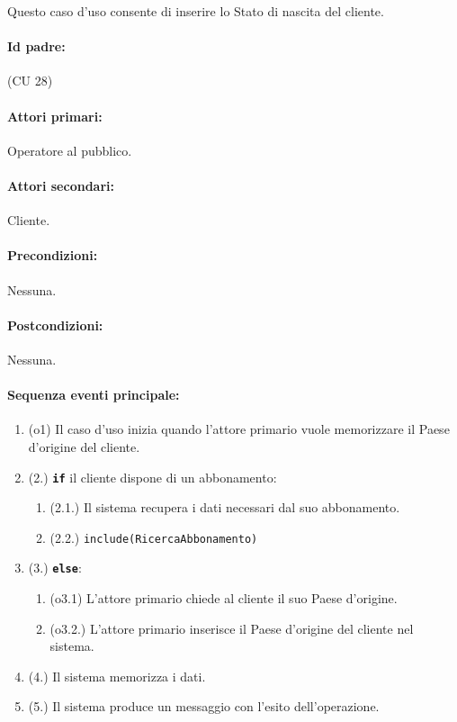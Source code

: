 \documentclass{article}
\begin{document}
	\indent\indent Questo caso d'uso consente di inserire lo Stato di nascita del cliente.
	
	\paragraph{Id padre:}(CU 28)
	
	\paragraph{Attori primari:}Operatore al pubblico.
	
	\paragraph{Attori secondari:}Cliente.
	
	\paragraph{Precondizioni:}Nessuna.
	
	\paragraph{Postcondizioni:}Nessuna.
	
	\paragraph{Sequenza eventi principale:}

	\begin{enumerate}[itemsep=8pt,parsep=0pt]
	    \item(o1) Il caso d'uso inizia quando l'attore primario vuole memorizzare il Paese d'origine del cliente. 
	    \item(2.) \texttt{\textbf{if}} il cliente dispone di un abbonamento:
			\begin{enumerate}	[leftmargin=28pt]
			\item (2.1.) Il sistema recupera i dati necessari dal suo abbonamento. %
			\item (2.2.) \texttt{{include(RicercaAbbonamento)}}
  			\end{enumerate}
  		\item(3.) \texttt{\textbf{else}}:
  		\begin{enumerate}	[leftmargin=28pt]
	        \item(o3.1) L'attore primario chiede al cliente il suo Paese d'origine.
	        \item(o3.2.) L'attore primario inserisce il Paese d'origine del cliente nel sistema.
	    \end{enumerate}
		\item(4.) Il sistema memorizza i dati.
		\item(5.) Il sistema produce un messaggio con l'esito dell'operazione.
	
	\end{enumerate}
	
\end{document}
